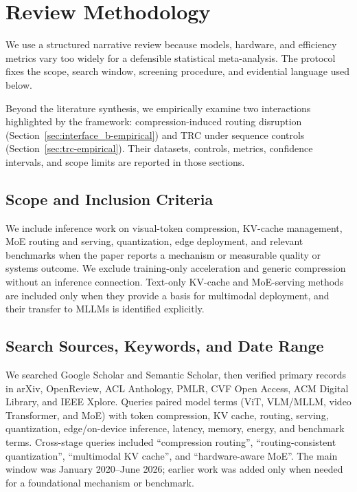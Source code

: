 \documentclass[10pt]{article}
\newenvironment{reviewchange}{\begingroup\color{red}}{\endgroup}
\begin{document}
\begin{reviewchange}
\section{Review Methodology}
\label{sec:methodology}

We use a structured narrative review because models, hardware, and efficiency metrics
vary too widely for a defensible statistical meta-analysis.  The protocol fixes the
scope, search window, screening procedure, and evidential language used below.

Beyond the literature synthesis, we empirically examine two interactions highlighted by the framework: compression-induced routing disruption
(Section~\ref{sec:interface_b-empirical}) and TRC under sequence controls
(Section~\ref{sec:trc-empirical}).  Their datasets, controls, metrics, confidence
intervals, and scope limits are reported in those sections.

\subsection{Scope and Inclusion Criteria}

We include inference work on visual-token compression, KV-cache management, MoE
routing and serving, quantization, edge deployment, and relevant benchmarks when the
paper reports a mechanism or measurable quality or systems outcome.  We exclude
training-only acceleration and generic compression without an inference connection.
Text-only KV-cache and MoE-serving methods are included only when they provide a basis
for multimodal deployment, and their transfer to MLLMs is identified explicitly.

\subsection{Search Sources, Keywords, and Date Range}

We searched Google Scholar and Semantic Scholar, then verified primary records in
arXiv, OpenReview, ACL Anthology, PMLR, CVF Open Access, ACM Digital Library, and IEEE
Xplore.  Queries paired model terms (ViT, VLM/MLLM, video Transformer, and MoE) with
token compression, KV cache, routing, serving, quantization, edge/on-device inference,
latency, memory, energy, and benchmark terms.  Cross-stage queries included
``compression routing'', ``routing-consistent quantization'', ``multimodal KV cache'',
and ``hardware-aware MoE''.  The main window was January 2020--June 2026; earlier work
was added only when needed for a foundational mechanism or benchmark.


\end{reviewchange}
\end{document}
